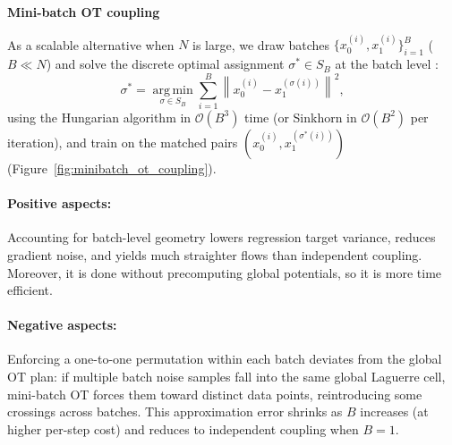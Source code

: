 \textbf{Mini-batch OT coupling}

As a scalable alternative when $N$ is large, we draw batches $\{x_0^{(i)}, x_1^{(i)}\}_{i=1}^{B}$ ($B \ll N$) and solve the discrete optimal assignment $\sigma^* \in S_B$ at the batch level \cite{tong2024improving, pooladian2023multisample}:
\begin{equation}
    \sigma^* = \operatorname*{arg\,min}_{\sigma \in S_B} \sum_{i=1}^B \left\| x_0^{(i)} - x_1^{(\sigma(i))} \right\|^2,
\end{equation}
using the Hungarian algorithm in $\mathcal{O}(B^3)$ time (or Sinkhorn in $\mathcal{O}(B^2)$ per iteration), and train on the matched pairs $(x_0^{(i)}, x_1^{(\sigma^*(i))})$ (Figure~\ref{fig:minibatch_ot_coupling}).

\paragraph{Positive aspects:} Accounting for batch-level geometry lowers regression target variance, reduces gradient noise, and yields much straighter flows than independent coupling. Moreover, it is done without precomputing global potentials, so it is more time efficient.

\paragraph{Negative aspects:} Enforcing a one-to-one permutation within each batch deviates from the global OT plan: if multiple batch noise samples fall into the same global Laguerre cell, mini-batch OT forces them toward distinct data points, reintroducing some crossings across batches. This approximation error shrinks as $B$ increases (at higher per-step cost) and reduces to independent coupling when $B=1$.


